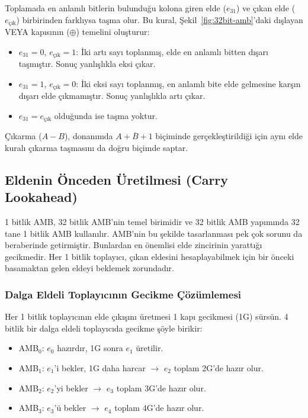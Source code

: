 \begin{bilginot}\label{bilginot:tasma-elde}
Toplamada en anlamlı bitlerin bulunduğu kolona giren elde ($e_{31}$) ve çıkan elde ($e_{\text{çık}}$) birbirinden farklıysa taşma olur. Bu kural, Şekil~\ref{fig:32bit-amb}'daki dışlayan VEYA kapısının ($\oplus$) temelini oluşturur:

\begin{itemize}
\item $e_{31} = 0$, $e_{\text{çık}} = 1$: İki artı sayı toplanmış, elde en anlamlı bitten dışarı taşmıştır. Sonuç yanlışlıkla eksi çıkar.
\item $e_{31} = 1$, $e_{\text{çık}} = 0$: İki eksi sayı toplanmış, en anlamlı bite elde gelmesine karşın dışarı elde çıkmamıştır. Sonuç yanlışlıkla artı çıkar.
\item $e_{31} = e_{\text{çık}}$ olduğunda ise taşma yoktur.
\end{itemize}

Çıkarma ($A - B$), donanımda $A + \overline{B} + 1$ biçiminde gerçekleştirildiği için aynı elde kuralı çıkarma taşmasını da doğru biçimde saptar.
\end{bilginot}

\subsection{Eldenin Önceden Üretilmesi (Carry Lookahead)}
\label{sec:carry-lookahead}

1 bitlik AMB, 32 bitlik AMB'nin temel birimidir ve 32 bitlik AMB yapımında 32 tane 1 bitlik AMB kullanılır. AMB'nin bu şekilde tasarlanması pek çok sorunu da beraberinde getirmiştir. Bunlardan en önemlisi elde zincirinin yarattığı gecikmedir. Her 1 bitlik toplayıcı, çıkan eldesini hesaplayabilmek için bir önceki basamaktan gelen eldeyi beklemek zorundadır.

\subsubsection*{Dalga Eldeli Toplayıcının Gecikme Çözümlemesi}
Her 1 bitlik toplayıcının elde çıkışını üretmesi 1 kapı gecikmesi (1G) sürsün. 4 bitlik bir dalga eldeli toplayıcıda gecikme şöyle birikir:

\begin{itemize}
\item AMB$_0$: $e_0$ hazırdır, 1G sonra $e_1$ üretilir.
\item AMB$_1$: $e_1$'i bekler, 1G daha harcar $\rightarrow$ $e_2$ toplam 2G'de hazır olur.
\item AMB$_2$: $e_2$'yi bekler $\rightarrow$ $e_3$ toplam 3G'de hazır olur.
\item AMB$_3$: $e_3$'ü bekler $\rightarrow$ $e_4$ toplam 4G'de hazır olur.
\end{itemize}


